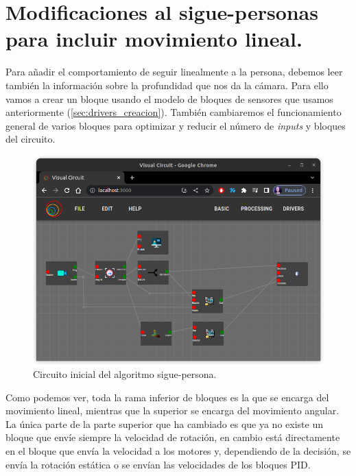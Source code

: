 \section{Modificaciones al sigue-personas para incluir movimiento lineal.}
\label{sec:FP_2}

Para añadir el comportamiento de seguir linealmente a la persona, debemos leer también la información sobre la profundidad que nos da la cámara.
Para ello vamos a crear un bloque usando el modelo de bloques de sensores que usamos anteriormente (\ref{sec:drivers_creacion}).
También cambiaremos el funcionamiento general de varios bloques para optimizar y reducir el número de \textit{inputs} y bloques del circuito.

\begin{figure} [H]
    \begin{center}
        \includegraphics[width=12cm]{figs/c5/follow_person_final_model.png}
    \end{center}
    \caption[Circuito sigue-personas inicial]{Circuito inicial del algoritmo sigue-persona.}
    \label{fig:final_follow_person}
\end{figure}

Como podemos ver, toda la rama inferior de bloques es la que se encarga del movimiento lineal, mientras que la superior se encarga del movimiento angular.
La única parte de la parte superior que ha cambiado es que ya no existe un bloque que envíe siempre la velocidad de rotación, en cambio está directamente en el
bloque que envía la velocidad a los motores y, dependiendo de la decisión, se envía la rotación estática o se envían las velocidades de los bloques PID.

